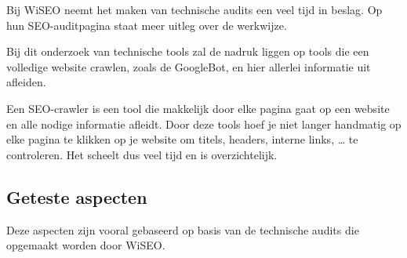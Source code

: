 Bij WiSEO neemt het maken van technische audits een veel tijd in beslag. Op hun SEO-auditpagina staat meer uitleg over de werkwijze. \textcite{AUDIT} 

Bij dit onderzoek van technische tools zal de nadruk liggen op tools die een volledige website crawlen, zoals de GoogleBot, en hier allerlei informatie uit afleiden.

Een SEO-crawler is een tool die makkelijk door elke pagina gaat op een website en alle nodige informatie afleidt. Door deze tools hoef je niet langer handmatig op elke pagina te klikken op je website om titels, headers, interne links, … te controleren. Het scheelt dus veel tijd en is overzichtelijk. 


\subsection{Geteste aspecten}
\label{ch: Geteste aspecten}

Deze aspecten zijn vooral gebaseerd op basis van de technische audits die opgemaakt worden door WiSEO.

